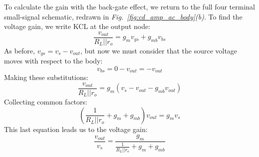 To calculate the gain with the back-gate effect, we return to the full four terminal small-signal schematic, redrawn in \emph{Fig.~\ref{fig:cd_amp_ac_body}(b)}.  To find the voltage gain, we write KCL at the output node: 
    \begin{equation}
        \frac{{{v_{out}}}}{{{R_L}||{r_o}}} = {g_m}{v_{gs}} + g_{mb} v_{bs} 
    \end{equation}
As before, $v_{gs} = v_{s} - v_{out}$, but now we must consider that the source voltage moves with respect to the body:
    \begin{equation}
        v_{bs} = 0 - v_{out} = -v_{out}
    \end{equation}
Making these substitutions:
    \begin{equation}
        \frac{{{v_{out}}}}{{{R_L}||{r_o}}} = {g_m}\left( {{v_{s}} - {v_{out}}}  - g_{mb} v_{out} \right)
    \end{equation}
Collecting common factors:
    \begin{equation}
        \left( {\frac{1}{{{R_L}||{r_o}}} + {g_m} + g_{mb} } \right){v_{out}} = {g_m}{v_{s}}
    \end{equation}
This last equation leads us to the voltage gain:
    \begin{equation}
        \frac{{{v_{out}}}}{{{v_{s}}}} = \frac{{{g_m}}}{{\frac{1}{{{R_L}||{r_o}}} + {g_m} + g_{mb}}}
    \end{equation}
